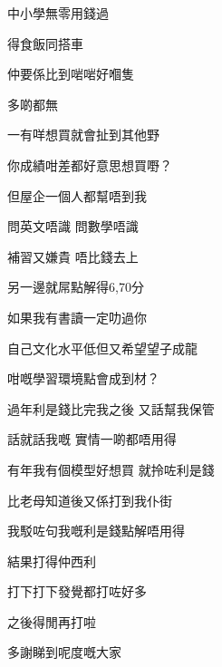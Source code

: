 中小學無零用錢過

得食飯同搭車

仲要係比到啱啱好嗰隻

多啲都無

一有咩想買就會扯到其他野

你成績咁差都好意思想買嘢？

但屋企一個人都幫唔到我

問英文唔識 問數學唔識

補習又嫌貴 唔比錢去上

另一邊就屌點解得6,70分

如果我有書讀一定叻過你

自己文化水平低但又希望望子成龍

咁嘅學習環境點會成到材？

過年利是錢比完我之後 又話幫我保管

話就話我嘅 實情一啲都唔用得

有年我有個模型好想買 就拎咗利是錢

比老母知道後又係打到我仆街

我駁咗句我嘅利是錢點解唔用得

結果打得仲西利

打下打下發覺都打咗好多

之後得閒再打啦

多謝睇到呢度嘅大家

